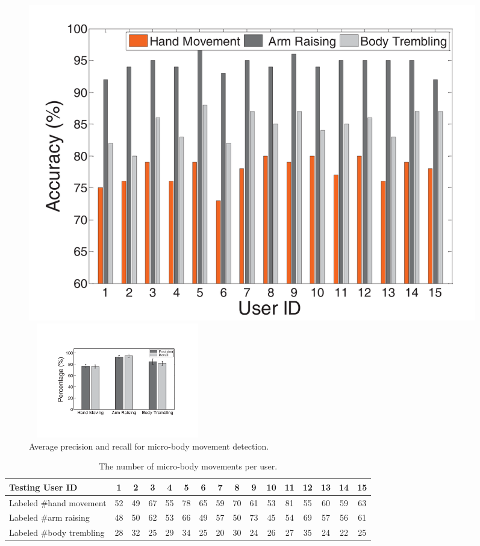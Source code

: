 \begin{figure}
	\centering
	\begin{minipage}{.485\textwidth}
		 \includegraphics[width=0.95\textwidth]{Figures/micro_movement_zhu.pdf}
		\caption{Micro body movement detection accuracy for each user.}\label{fig:micro_movement_zhu}	
	\end{minipage}%
\hspace{3pt}
	\begin{minipage}{.485\textwidth}
	 \centering
	\includegraphics[width=7.8cm,height=5cm]{Figures/micro_combine1.pdf}
	\caption{Average precision and recall for micro-body movement detection.}\label{fig:micro_combine}
	\end{minipage}
\end{figure}


\begin{table}[!t]\footnotesize
  \caption{The number of micro-body movements per user.}\label{tab:micro_move}
   \renewcommand\arraystretch{1}{\multirowsetup}{\centering}
        \begin{tabular}{lccccccccccccccc}
        \toprule
         \textbf{Testing User ID}    & 1& 2  & 3& 4& 5& 6& 7& 8& 9& 10& 11& 12& 13& 14& 15\\
        \midrule
            \rowcolor{Gray} {Labeled \#hand movement}  &52&49&67&55&78&65&59&70&61&53&81&55&60&59&63 \\
             { Labeled \#arm raising} &48&50&62&53&66&49&57&50&73&45&54&69&57&56&61\\
             \rowcolor{Gray} { Labeled \#body trembling} &28&32&25&29&34&25&20&30&24&26&27&35&24&22&25\\
        \bottomrule
 \end{tabular}
\end{table}


